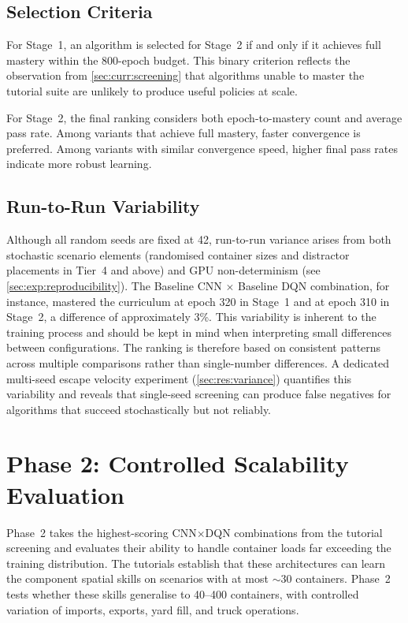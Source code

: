 \subsection{Selection Criteria}
\label{sec:exp:phase1:selection}

For Stage~1, an algorithm is selected for Stage~2 if and only if it achieves full mastery within the 800-epoch budget. This binary criterion reflects the observation from \cref{sec:curr:screening} that algorithms unable to master the tutorial suite are unlikely to produce useful policies at scale.

For Stage~2, the final ranking considers both epoch-to-mastery count and average pass rate. Among variants that achieve full mastery, faster convergence is preferred. Among variants with similar convergence speed, higher final pass rates indicate more robust learning.

\subsection{Run-to-Run Variability}
\label{sec:exp:phase1:variability}

Although all random seeds are fixed at 42, run-to-run variance arises from both stochastic scenario elements (randomised container sizes and distractor placements in Tier~4 and above) and GPU non-determinism (see \cref{sec:exp:reproducibility}). The Baseline CNN $\times$ Baseline DQN combination, for instance, mastered the curriculum at epoch 320 in Stage~1 and at epoch 310 in Stage~2, a difference of approximately 3\%. This variability is inherent to the training process and should be kept in mind when interpreting small differences between configurations. The ranking is therefore based on consistent patterns across multiple comparisons rather than single-number differences. A dedicated multi-seed escape velocity experiment (\cref{sec:res:variance}) quantifies this variability and reveals that single-seed screening can produce false negatives for algorithms that succeed stochastically but not reliably.

\section{Phase 2: Controlled Scalability Evaluation}
\label{sec:exp:phase2}

Phase~2 takes the highest-scoring CNN$\times$DQN combinations from the tutorial screening and evaluates their ability to handle container loads far exceeding the training distribution. The tutorials establish that these architectures can learn the component spatial skills on scenarios with at most ${\sim}30$ containers. Phase~2 tests whether these skills generalise to 40--400 containers, with controlled variation of imports, exports, yard fill, and truck operations.


